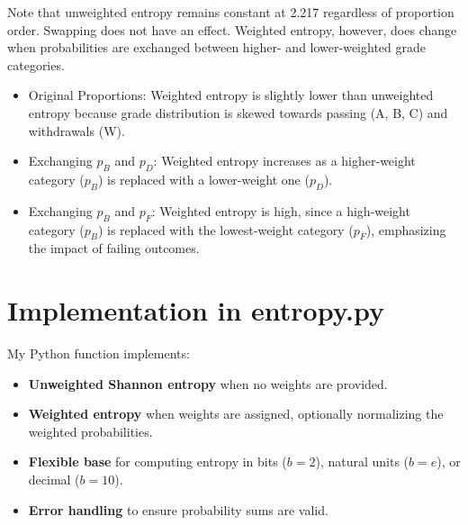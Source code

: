 \documentclass{article}
\begin{document}
Note that unweighted entropy remains constant at 2.217 regardless of proportion order. Swapping does not have an effect. Weighted entropy, however, does change when probabilities are exchanged between higher- and lower-weighted grade categories.

\begin{itemize}
    \item Original Proportions: Weighted entropy is slightly lower than unweighted entropy because grade distribution is skewed towards passing (A, B, C) and withdrawals (W).
    \item Exchanging \( p_B \) and \( p_D \): Weighted entropy increases as a higher-weight category (\( p_B \)) is replaced with a lower-weight one (\( p_D \)).
    \item Exchanging \( p_B \) and \( p_F \): Weighted entropy is high, since a high-weight category (\( p_B \)) is replaced with the lowest-weight category (\( p_F \)), emphasizing the impact of failing outcomes.
\end{itemize}


\section{Implementation in entropy.py}

My Python function implements:

\begin{itemize}
    \item \textbf{Unweighted Shannon entropy} when no weights are provided.
    \item \textbf{Weighted entropy} when weights are assigned, optionally normalizing the weighted probabilities.
    \item \textbf{Flexible base} for computing entropy in bits (\( b=2 \)), natural units (\( b=e \)), or decimal (\( b=10 \)).
    \item \textbf{Error handling} to ensure probability sums are valid.
\end{itemize}
\end{document}
